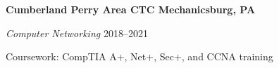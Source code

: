 \textbf{Cumberland Perry Area CTC \hfill Mechanicsburg, PA} \par
\textit{Computer Networking} \hfill 2018--2021\par
Coursework: CompTIA A+, Net+, Sec+, and CCNA training \par
